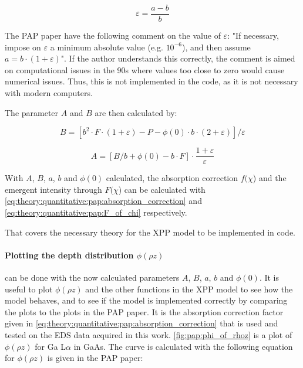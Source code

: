 \begin{equation}
    \label{eq:theory:quantitative:pap:epsilon}
    \varepsilon = \frac{a-b}{b}
\end{equation}

The PAP paper have the following comment on the value of $\varepsilon$: "If necessary, impose on $\varepsilon$ a minimum absolute value (e.g. $10^{-6}$), and then assume $ a = b \cdot(1+\varepsilon) $".
If the author understands this correctly, the comment is aimed on computational issues in the 90s where values too close to zero would cause numerical issues.
Thus, this is not implemented in the code, as it is not necessary with modern computers.


The parameter $A$ and $B$ are then calculated by:

\begin{equation}
    \label{eq:theory:quantitative:pap:big_B}
    B = [b^2 \cdot F \cdot (1 + \varepsilon) - P - \phi(0) \cdot b \cdot (2+\varepsilon) ] / \varepsilon
\end{equation}

\begin{equation}
    \label{eq:theory:quantitative:pap:_big_A}
    A = [B/b + \phi(0) - b \cdot F] \cdot \frac{1+ \varepsilon}{\varepsilon}
\end{equation}


With $A$, $B$, $a$, $b$ and $\phi(0)$ calculated, the absorption correction $f(\chi$) and the emergent intensity through $F(\chi$) can be calculated with \cref{eq:theory:quantitative:pap:absorption_correction} and \cref{eq:theory:quantitative:pap:F_of_chi} respectively.


That covers the necessary theory for the XPP model to be implemented in code.


\paragraph{Plotting the depth distribution $\phi(\rho z)$} can be done with the now calculated parameters $A$, $B$, $a$, $b$ and $\phi(0)$.
It is useful to plot $\phi(\rho z)$ and the other functions in the XPP model to see how the model behaves, and to see if the model is implemented correctly by comparing the plots to the plots in the PAP paper.
It is the absorption correction factor given in \cref{eq:theory:quantitative:pap:absorption_correction} that is used and tested on the EDS data acquired in this work.
\cref{fig:pap:phi_of_rhoz} is a plot of $\phi(\rho z)$ for Ga L$\alpha$ in GaAs.
The curve is calculated with the following equation for $\phi(\rho z)$ is given in the PAP paper:

